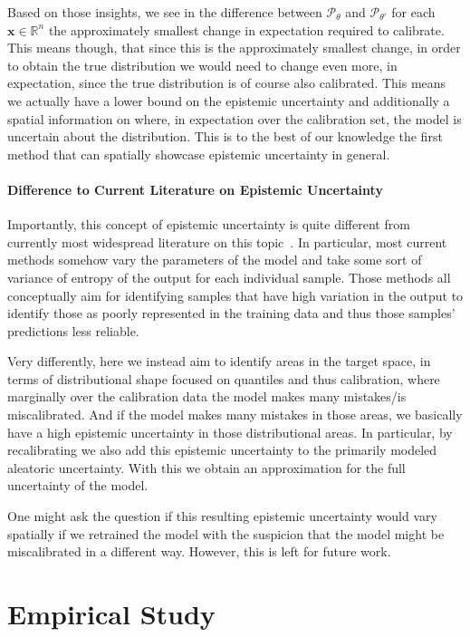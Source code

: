 Based on those insights, we see in the difference between $\mathscr{P}_\theta$ and $\mathscr{P}_{\theta'}$ for each $\mathbf{x}\in\mathbb{R}^n$ the approximately smallest change in expectation required to calibrate. This means though, that since this is the approximately smallest change, in order to obtain the true distribution we would need to change even more, in expectation, since the true distribution is of course also calibrated. This means we actually have a lower bound on the epistemic uncertainty and additionally a spatial information on where, in expectation over the calibration set, the model is uncertain about the distribution. This is to the best of our knowledge the first method that can spatially showcase epistemic uncertainty in general.

\subsubsection{Difference to Current Literature on Epistemic Uncertainty}

Importantly, this concept of epistemic uncertainty is quite different from currently most widespread literature on this topic~\cite{gal_dropout_2016,hullermeier_aleatoric_2021}. In particular, most current methods somehow vary the parameters of the model and take some sort of variance of entropy of the output for each individual sample. Those methods all conceptually aim for identifying samples that have high variation in the output to identify those as poorly represented in the training data and thus those samples' predictions less reliable.

Very differently, here we instead aim to identify areas in the target space, in terms of distributional shape focused on quantiles and thus calibration, where marginally over the calibration data the model makes many mistakes/is miscalibrated. And if the model makes many mistakes in those areas, we basically have a high epistemic uncertainty in those distributional areas. In particular, by recalibrating we also add this epistemic uncertainty to the primarily modeled aleatoric uncertainty. With this we obtain an approximation for the full uncertainty of the model.

One might ask the question if this resulting epistemic uncertainty would vary spatially if we retrained the model with the suspicion that the model might be miscalibrated in a different way. However, this is left for future work.

\chapter{Empirical Study}\label{chap:empirical_study}

